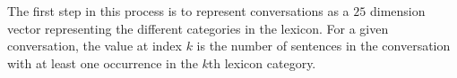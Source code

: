 \documentclass[letterpaper]{article} %
\newcommand{\kibitz}[2]{\ifnum\Comments=1{\textcolor{#1}{#2}}\fi}
\newcommand{\kg}[1]{\kibitz{red}{[KG:#1]}}
\begin{document}



The first step in this process is to represent  conversations as a $25$ dimension vector representing the different categories in the lexicon.
For a given conversation, the value at index  $k$ is the number of sentences in the conversation with at least one occurrence in the \(k\)th lexicon category.
\end{document}
